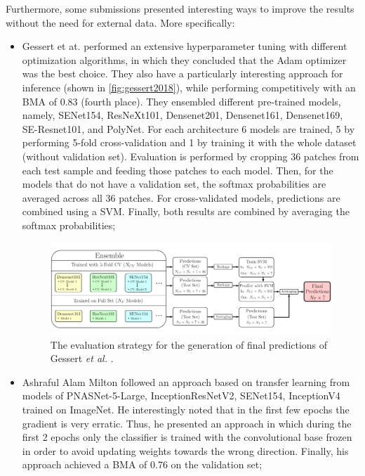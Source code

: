     Furthermore, some submissions presented interesting ways to improve the results without the need for external data. More specifically: 
    \begin{itemize}
        \item Gessert et at. \cite{gessert2018} performed an extensive hyperparameter tuning with different optimization algorithms, in which they concluded that the Adam optimizer \cite{adam} was the best choice. They also have a particularly interesting approach for inference (shown in \autoref{fig:gessert2018}), while performing competitively with an \ac{BMA} of 0.83 (fourth place). They ensembled different pre-trained models, namely, SENet154, ResNeXt101, Densenet201, Densenet161, Densenet169, SE-Resnet101, and PolyNet. For each architecture 6 models are trained, 5 by performing 5-fold cross-validation and 1 by training it with the whole dataset (without validation set). Evaluation is performed by cropping 36 patches from each test sample and feeding those patches to each model. Then, for the models that do not have a validation set, the softmax probabilities are averaged across all 36 patches. For cross-validated models, predictions are combined using a \ac{SVM}. Finally, both results are combined by averaging the softmax probabilities;
        \begin{figure}[ht]
            \centering
            \includegraphics[width=\linewidth]{figs/gessert2018.png}
            \caption{The evaluation strategy for the generation of final predictions of Gessert \textit{et al.} \cite{gessert2018}.}
            \label{fig:gessert2018}
        \end{figure}
        
        \item Ashraful Alam Milton \cite{Milton2018} followed an approach based on transfer learning from models of PNASNet-5-Large, InceptionResNetV2, SENet154, InceptionV4 trained on ImageNet. He interestingly noted that in the first few epochs the gradient is very erratic. Thus, he presented an approach in which during the first 2 epochs only the classifier is trained with the convolutional base frozen in order to avoid updating weights towards the wrong direction. Finally, his approach achieved a \ac{BMA} of 0.76 on the validation set;
        

\end{itemize}
